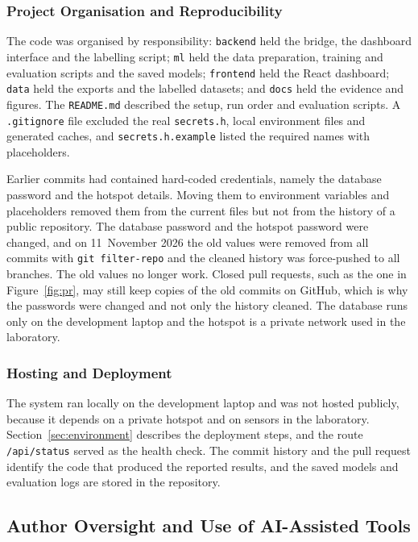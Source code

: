 \documentclass[12pt, a4paper]{article}
\begin{document}
\subsubsection{Project Organisation and Reproducibility}

The code was organised by responsibility: \texttt{backend} held the bridge, the dashboard interface and the labelling script; \texttt{ml} held the data preparation, training and evaluation scripts and the saved models; \texttt{frontend} held the React dashboard; \texttt{data} held the exports and the labelled datasets; and \texttt{docs} held the evidence and figures. The \texttt{README.md} described the setup, run order and evaluation scripts. A \texttt{.gitignore} file excluded the real \texttt{secrets.h}, local environment files and generated caches, and \texttt{secrets.h.example} listed the required names with placeholders.

Earlier commits had contained hard-coded credentials, namely the database password and the hotspot details. Moving them to environment variables and placeholders removed them from the current files but not from the history of a public repository. The database password and the hotspot password were changed, and on 11~November 2026 the old values were removed from all commits with \texttt{git filter-repo} and the cleaned history was force-pushed to all branches. The old values no longer work. Closed pull requests, such as the one in Figure~\ref{fig:pr}, may still keep copies of the old commits on GitHub, which is why the passwords were changed and not only the history cleaned. The database runs only on the development laptop and the hotspot is a private network used in the laboratory.

\subsubsection{Hosting and Deployment}

The system ran locally on the development laptop and was not hosted publicly, because it depends on a private hotspot and on sensors in the laboratory. Section~\ref{sec:environment} describes the deployment steps, and the route \texttt{/api/status} served as the health check. The commit history and the pull request identify the code that produced the reported results, and the saved models and evaluation logs are stored in the repository.


\subsection{Author Oversight and Use of AI-Assisted Tools}
\end{document}
